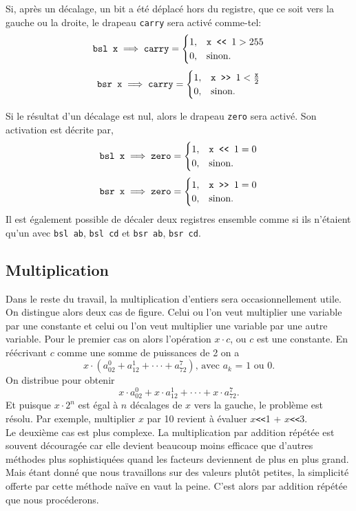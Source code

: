 \documentclass{article}
\begin{document}
Si, après un décalage, un bit a été déplacé hors du registre, que ce soit vers la gauche ou la droite, le drapeau \texttt{carry} sera activé comme-tel:
$$\texttt{bsl x} \implies \texttt{carry} = \begin{cases}
1, & \texttt{x}\verb| << | 1 > 255\\
0, & \text{sinon.}
\end{cases}$$
$$\texttt{bsr x} \implies \texttt{carry} = \begin{cases}
1, & \texttt{x}\verb| >> | 1 < \frac{\texttt{x}}{2}\\
0, & \text{sinon.}
\end{cases}$$

Si le résultat d'un décalage est nul, alors le drapeau \texttt{zero} sera activé. Son activation est décrite par,
$$\texttt{bsl x} \implies \texttt{zero} = \begin{cases}
1, & \texttt{x}\verb| << | 1 = 0\\
0, & \text{sinon.}
\end{cases}$$
$$\texttt{bsr x} \implies \texttt{zero} = \begin{cases}
1, & \texttt{x}\verb| >> | 1 = 0\\
0, & \text{sinon.}
\end{cases}$$
Il est également possible de décaler deux registres ensemble comme si ils n'étaient qu'un avec \texttt{bsl ab}, \texttt{bsl cd} et \texttt{bsr ab}, \texttt{bsr cd}.
\subsection{Multiplication}
Dans le reste du travail, la multiplication d'entiers sera occasionnellement utile. On distingue alors deux cas de figure.
Celui ou l'on veut multiplier une variable par une constante et celui ou l'on veut multiplier une variable par une autre variable.
Pour le premier cas on alors l'opération $x\cdot c$, ou $c$ est une constante. En réécrivant $c$ comme une somme de puissances de 2 on a
$$
x\cdot(a_02^0+a_12^1+\cdot\cdot\cdot+a_72^7) \text{, avec $a_k$ = 1 ou 0.}
$$
On distribue pour obtenir
$$x\cdot a_02^0+x\cdot a_12^1+\cdot\cdot\cdot+x\cdot a_72^7.$$
Et puisque $x\cdot2^n$ est égal à $n$ décalages de $x$ vers la gauche, 
le problème est résolu. Par exemple, multiplier $x$ par 10 revient à évaluer $x$\verb|<<|1 + $x$\verb|<<|3.\\
Le deuxième cas est plus complexe. La multiplication par addition répétée est souvent découragée car elle devient beaucoup moins efficace que d'autres méthodes plus sophistiquées quand les facteurs deviennent de plus en plus grand. Mais étant donné que nous travaillons sur des valeurs plutôt petites, la simplicité offerte par cette méthode naïve en vaut la peine. C'est alors par addition répétée que nous procéderons.
\end{document}

